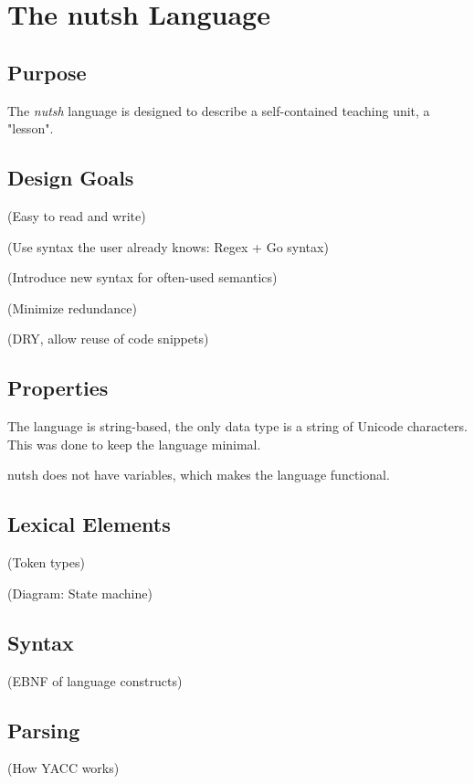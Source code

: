 \documentclass[twoside]{scrreprt}
\begin{document}
\chapter{The nutsh Language}

\section{Purpose}

The \emph{nutsh} language is designed to describe a self-contained teaching unit, a "lesson".

\section{Design Goals}

(Easy to read and write)

    (Use syntax the user already knows: Regex + Go syntax)

    (Introduce new syntax for often-used semantics)

(Minimize redundance)

    (DRY, allow reuse of code snippets)

\section{Properties}

The language is string-based, the only data type is a string of Unicode characters. This was done to keep the language minimal.

nutsh does not have variables, which makes the language functional.

\section{Lexical Elements}

(Token types)

(Diagram: State machine)

\section{Syntax}

(EBNF of language constructs)

\section{Parsing}

(How YACC works)
\end{document}
